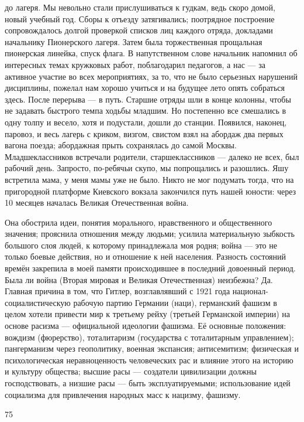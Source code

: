 \label{25-1}
до лагеря. Мы невольно стали прислушиваться к гудкам, ведь скоро домой, новый учебный год. Сборы к отъезду затягивались; поотрядное построение сопровождалось долгой проверкой списков лиц каждого отряда, докладами начальнику Пионерского лагеря. Затем была торжественная прощальная пионерская линейка, спуск флага. В напутственном слове начальник напомнил об интересных темах кружковых работ, поблагодарил педагогов, а нас — за активное участие во всех мероприятиях, за то, что не было серьезных нарушений дисциплины, пожелал нам хорошо учиться и на будущее лето опять собраться здесь. После перерыва — в путь. Старшие отряды шли в конце колонны, чтобы не задавать быстрого темпа ходьбы младшим. Но постепенно все смешались в одну толпу и весело, хотя и подустали, дошли до станции. Появился, наконец, паровоз, и весь лагерь с криком, визгом, свистом взял на абордаж два первых вагона поезда; абордажная прыть сохранялась до самой Москвы. Младшеклассников встречали родители, старшеклассников — далеко не всех, был рабочий день. Запросто, по-ребячьи скупо, мы попрощались и разошлись. Яшу встретила мама, у меня мамы уже не было. Никто не мог подумать тогда, что на пригородной платформе Киевского вокзала закончился путь нашей юности: через 10 месяцев началась Великая Отечественная война.

\label{26-1}
Она обострила идеи, понятия морального, нравственного и общественного значения; прояснила отношения между людьми; усилила материальную зыбкость большого слоя людей, к которому принадлежала моя родня; война — это не только боевые действия, но и отношение к ней населения. Разность состояний времён закрепила в моей памяти происходившее в последний довоенный период. Была ли война (Вторая мировая и Великая Отечественная) неизбежна? Да. Главная причина в том, что Гитлер, возглавлявший с 1921 года национал-социалистическую рабочую партию Германии (наци), германский фашизм в целом хотели привести мир к третьему рейху (третьей Германской империи) на основе расизма — официальной идеологии фашизма. Её основные положения: вождизм (фюрерство), тоталитаризм (государства с тоталитарным управлением); пангерманизм через геополитику, военная экспансия; антисемитизм; физическая и психологическая неравноценность человеческих рас и влияние этого на историю и культуру общества; высшие расы — создатели цивилизации должны господствовать, а низшие расы — быть эксплуатируемыми; использование идей социализма для привлечения народных масс к нацизму, фашизму.

75

